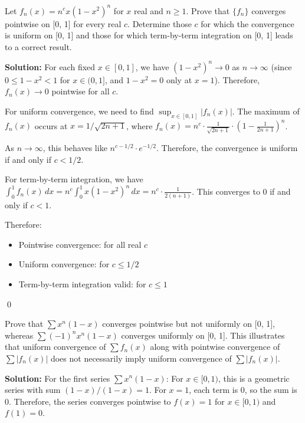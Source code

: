 \begin{problembox}
Let \( f_n(x) = n^c x(1 - x^2)^n \) for \( x \) real and \( n \geq 1 \). Prove that \( \{f_n\} \) converges pointwise on [0, 1] for every real \( c \). Determine those \( c \) for which the convergence is uniform on [0, 1] and those for which term-by-term integration on [0, 1] leads to a correct result.
\end{problembox}

\bigskip\noindent\textbf{Solution:} For each fixed \( x \in [0, 1] \), we have \( (1 - x^2)^n \to 0 \) as \( n \to \infty \) (since \( 0 \leq 1 - x^2 < 1 \) for \( x \in (0, 1] \), and \( 1 - x^2 = 0 \) only at \( x = 1 \)). Therefore, \( f_n(x) \to 0 \) pointwise for all \( c \).

For uniform convergence, we need to find \( \sup_{x \in [0,1]} |f_n(x)| \). The maximum of \( f_n(x) \) occurs at \( x = 1/\sqrt{2n + 1} \), where \( f_n(x) = n^c \cdot \frac{1}{\sqrt{2n + 1}} \cdot \left(1 - \frac{1}{2n + 1}\right)^n \).

As \( n \to \infty \), this behaves like \( n^{c - 1/2} \cdot e^{-1/2} \). Therefore, the convergence is uniform if and only if \( c < 1/2 \).

For term-by-term integration, we have \( \int_0^1 f_n(x) \, dx = n^c \int_0^1 x(1 - x^2)^n \, dx = n^c \cdot \frac{1}{2(n + 1)} \). This converges to 0 if and only if \( c < 1 \).

Therefore:
\begin{itemize}
\item Pointwise convergence: for all real \( c \)
\item Uniform convergence: for \( c \le 1/2 \)
\item Term-by-term integration valid: for \( c \le 1 \)
\end{itemize}\qed


\begin{problembox}
Prove that \( \sum x^n (1 - x) \) converges pointwise but not uniformly on [0, 1], whereas \( \sum (-1)^n x^n (1 - x) \) converges uniformly on [0, 1]. This illustrates that uniform convergence of \( \sum f_n(x) \) along with pointwise convergence of \( \sum |f_n(x)| \) does not necessarily imply uniform convergence of \( \sum |f_n(x)| \).
\end{problembox}

\bigskip\noindent\textbf{Solution:} For the first series \( \sum x^n (1 - x) \): For \( x \in [0, 1) \), this is a geometric series with sum \( (1 - x)/(1 - x) = 1 \). For \( x = 1 \), each term is 0, so the sum is 0. Therefore, the series converges pointwise to \( f(x) = 1 \) for \( x \in [0, 1) \) and \( f(1) = 0 \).

